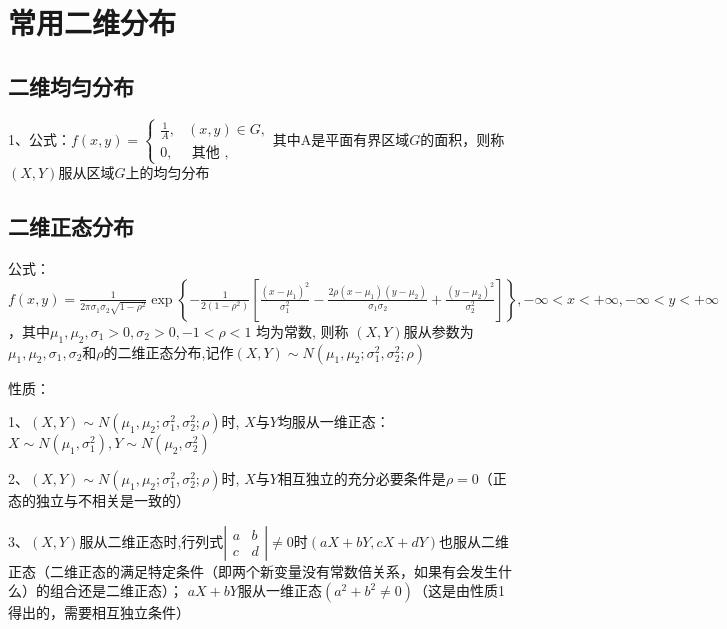\section{常用二维分布}



\subsection{二维均匀分布}

1、公式：$f(x, y)=\left\{\begin{array}{lc} \frac{1}{A}, & (x, y) \in G, \\ 0, & \text { 其他 }, \end{array}\right.$其中A是平面有界区域$G$的面积，则称$(X,Y)$服从区域$G$上的均匀分布



\subsection{二维正态分布}

公式：$f(x, y)=\frac{1}{2 \pi \sigma_{1} \sigma_{2} \sqrt{1-\rho^{2}}} \exp \left\{-\frac{1}{2\left(1-\rho^{2}\right)}\left[\frac{\left(x-\mu_{1}\right)^{2}}{\sigma_{1}^{2}}-\frac{2 \rho\left(x-\mu_{1}\right)\left(y-\mu_{2}\right)}{\sigma_{1} \sigma_{2}}+\frac{\left(y-\mu_{2}\right)^{2}}{\sigma_{2}^{2}}\right]\right\}, -\infty<x<+\infty,-\infty<y<+\infty$，其中$\mu_{1}, \mu_{2}, \sigma_{1}>0, \sigma_{2}>0,-1<\rho<1$ 均为常数, 则称 $(X, Y) $服从参数为$\mu_{1}, \mu_{2}, \sigma_{1}, \sigma_{2}$和$\rho$的二维正态分布,记作$(X, Y) \sim N\left(\mu_{1}, \mu_{2} ; \sigma_{1}^{2}, \sigma_{2}^{2} ; \rho\right)$

性质：

1、$\left(X, Y\right) \sim N\left(\mu_{1}, \mu_{2} ; \sigma_{1}^{2}, \sigma_{2}^{2} ; \rho\right)$时, $X$与$Y$均服从一维正态：$X \sim{N}\left(\mu_{1}, \sigma_{1}^{2}\right), Y \sim N\left(\mu_{2}, \sigma_{2}^{2}\right)$

2、$(X, Y) \sim N\left(\mu_{1}, \mu_{2} ; \sigma_{1}^{2}, \sigma_{2}^{2} ; \rho\right)$时, $X$与$Y$相互独立的充分必要条件是$\rho=0$（正态的独立与不相关是一致的）

3、$(X, Y)$服从二维正态时,行列式$\left|\begin{array}{ll}a & b \\ c & d\end{array}\right| \neq 0$时$(a X+b Y, c X+d Y)$也服从二维正态（二维正态的满足特定条件（即两个新变量没有常数倍关系，如果有会发生什么）的组合还是二维正态）； $ a X+b Y$服从一维正态$\left(a^{2}+b^{2} \neq 0\right)$（这是由性质1得出的，需要相互独立条件）


